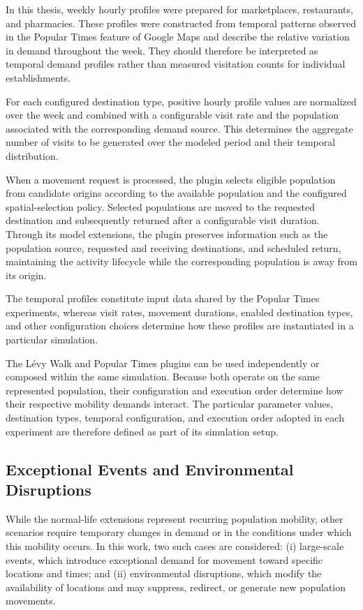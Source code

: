 In this thesis, weekly hourly profiles were prepared for marketplaces, restaurants, and pharmacies. These profiles were constructed from temporal patterns observed in the Popular Times feature of Google Maps and describe the relative variation in demand throughout the week. They should therefore be interpreted as temporal demand profiles rather than measured visitation counts for individual establishments.

For each configured destination type, positive hourly profile values are normalized over the week and combined with a configurable visit rate and the population associated with the corresponding demand source. This determines the aggregate number of visits to be generated over the modeled period and their temporal distribution.

When a movement request is processed, the plugin selects eligible population from candidate origins according to the available population and the configured spatial-selection policy. Selected populations are moved to the requested destination and subsequently returned after a configurable visit duration. Through its model extensions, the plugin preserves information such as the population source, requested and receiving destinations, and scheduled return, maintaining the activity lifecycle while the corresponding population is away from its origin.

The temporal profiles constitute input data shared by the Popular Times experiments, whereas visit rates, movement durations, enabled destination types, and other configuration choices determine how these profiles are instantiated in a particular simulation.

The L\'evy Walk and Popular Times plugins can be used independently or composed within the same simulation. Because both operate on the same represented population, their configuration and execution order determine how their respective mobility demands interact. The particular parameter values, destination types, temporal configuration, and execution order adopted in each experiment are therefore defined as part of its simulation setup.


\subsection{Exceptional Events and Environmental Disruptions} 
\label{sec:events_environmental_disruptions}

While the normal-life extensions represent recurring population mobility, other scenarios require temporary changes in demand or in the conditions under which this mobility occurs. In this work, two such cases are considered: (i) large-scale events, which introduce exceptional demand for movement toward specific locations and times; and (ii) environmental disruptions, which modify the availability of locations and may suppress, redirect, or generate new population movements.

